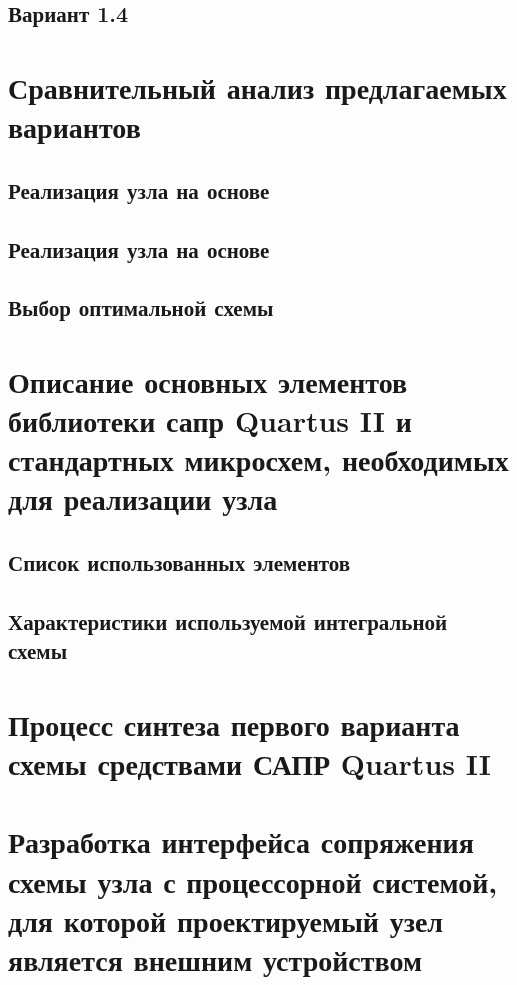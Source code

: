 \documentclass[a4paper,14pt,russian]{article}
\begin{document}
\subsection{Вариант 1.4}


\section{Сравнительный анализ предлагаемых вариантов}

\subsection{Реализация узла на основе}


\subsection{Реализация узла на основе}


\subsection{Выбор оптимальной схемы}


\section{Описание основных элементов библиотеки сапр Quartus II и стандартных микросхем, необходимых для реализации узла}

\subsection{Список использованных элементов}


\subsection{Характеристики используемой интегральной схемы}


\section{Процесс синтеза первого варианта схемы средствами САПР Quartus II}


\section{Разработка интерфейса сопряжения схемы узла с процессорной системой, для которой проектируемый узел является внешним устройством}

\end{document}
